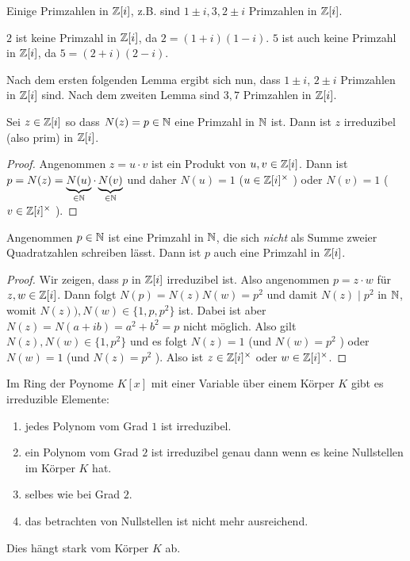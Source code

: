 \begin{eg}
	Einige Primzahlen in $\mathbb{Z}[i]$, z.B. sind $1\pm i,3,2\pm i$ Primzahlen in $\mathbb{Z}[i]$.

	$2$ ist keine Primzahl in $\mathbb{Z}[i]$, da $2 = (1+i)(1-i)$.
	$5$ ist auch keine Primzahl in $\mathbb{Z}[i]$, da $5 = (2+i)(2-i)$.

	Nach dem ersten folgenden Lemma ergibt sich nun, dass $1 \pm i$, $2 \pm i$ Primzahlen in $\mathbb{Z}[i]$ sind.
	Nach dem zweiten Lemma sind $3,7$ Primzahlen in $\mathbb{Z}[i]$.
\end{eg}

\begin{lemma}
	Sei $z \in \mathbb{Z}[i]$ so dass $N(z) = p \in \mathbb{N}$ eine Primzahl in $\mathbb{N}$ ist.
	Dann ist $z$ irreduzibel (also prim) in $\mathbb{Z}[i]$.
\end{lemma}

\begin{proof}
	Angenommen $z = u \cdot v$ ist ein Produkt von $u,v \in \mathbb{Z}[i]$.
	Dann ist $p = N(z) = \underbrace{N(u)}_{\in \mathbb{N}} \cdot \underbrace{N(v)}_{\in\mathbb{N}}$ und daher $N(u) = 1$ ($u \in \mathbb{Z}[i]^{\times}$ ) oder $N(v) = 1$ ($v \in \mathbb{Z}[i]^{\times}$ ).
\end{proof}

\begin{lemma}
	Angenommen $p \in \mathbb{N}$ ist eine Primzahl in $\mathbb{N}$, die sich \emph{nicht} als Summe zweier Quadratzahlen schreiben lässt.
	Dann ist $p$ auch eine Primzahl in $\mathbb{Z}[i]$.
\end{lemma}

\begin{proof}
	Wir zeigen, dass $p$ in $\mathbb{Z}[i]$ irreduzibel ist.
	Also angenommen $p = z \cdot w$ für $z,w \in \mathbb{Z}[i]$.
	Dann folgt $N(p) = N(z) N(w) = p^2$ und damit $N(z) \mid p^2$ in $\mathbb{N}$, womit $N(z)),N(w) \in \{1,p,p^2\} $ ist.
	Dabei ist aber $N(z) = N(a+ib) = a^2 + b^2 = p$ nicht möglich.
	Also gilt $N(z),N(w) \in \{1,p^2\}$ und es folgt $N(z) = 1$ (und $N(w) = p^2$ ) oder $N(w) = 1$ (und $N(z) = p^2$ ).
	Also ist $z \in \mathbb{Z}[i]^{\times}$ oder $w \in \mathbb{Z}[i]^{\times }$.
\end{proof}

\begin{eg}
	Im Ring der Poynome $K[x]$ mit einer Variable über einem Körper $K$ gibt es irreduzible Elemente:
	\begin{enumerate}[{Grad} 1:]
		\item jedes Polynom vom Grad $1$ ist irreduzibel.
		\item ein Polynom vom Grad $2$ ist irreduzibel genau dann wenn es keine Nullstellen im Körper $K$ hat.
		\item selbes wie bei Grad $2$.
		\item das betrachten von Nullstellen ist nicht mehr ausreichend. 
	\end{enumerate}
	Dies hängt stark vom Körper $K$ ab.
\end{eg}

